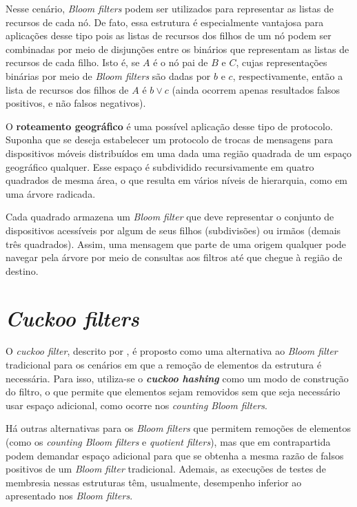 \documentclass[12pt,twoside,english,brazilian]{book}
\begin{document}
Nesse cenário, \textit{Bloom filters} podem ser utilizados para representar as listas de recursos de cada nó. De fato, essa estrutura é especialmente vantajosa para aplicações desse tipo pois as listas de recursos dos filhos de um nó podem ser combinadas por meio de disjunções entre os binários que representam as listas de recursos de cada filho. Isto é, se $A$ é o nó pai de $B$ e $C$, cujas representações binárias por meio de \textit{Bloom filters} são dadas por $b$ e $c$, respectivamente, então a lista de recursos dos filhos de $A$ é $b \lor c$ (ainda ocorrem apenas resultados falsos positivos, e não falsos negativos).

O \textbf{roteamento geográfico} é uma possível aplicação desse tipo de protocolo. Suponha que se deseja estabelecer um protocolo de trocas de mensagens para dispositivos móveis distribuídos em uma dada uma região quadrada de um espaço geográfico qualquer. Esse espaço é subdividido recursivamente em quatro quadrados de mesma área, o que resulta em vários níveis de hierarquia, como em uma árvore radicada.

Cada quadrado armazena um \textit{Bloom filter} que deve representar o conjunto de dispositivos acessíveis por algum de seus filhos (subdivisões) ou irmãos (demais três quadrados). Assim, uma mensagem que parte de uma origem qualquer pode navegar pela árvore por meio de consultas aos filtros até que chegue à região de destino.

\chapter{\textit{Cuckoo filters}}

O \textit{cuckoo filter}, descrito por \citet{cuckoo}, é proposto como uma alternativa ao \textit{Bloom filter} tradicional para os cenários em que a remoção de elementos da estrutura é necessária. Para isso, utiliza-se o \textbf{\textit{cuckoo hashing}} como um modo de construção do filtro, o que permite que elementos sejam removidos sem que seja necessário usar espaço adicional, como ocorre nos \textit{counting Bloom filters}.

Há outras alternativas para os \textit{Bloom filters} que permitem remoções de elementos (como os \textit{counting Bloom filters} e \textit{quotient filters}), mas que em contrapartida podem demandar espaço adicional para que se obtenha a mesma razão de falsos positivos de um \textit{Bloom filter} tradicional. Ademais, as execuções de testes de membresia nessas estruturas têm, usualmente, desempenho inferior ao apresentado nos \textit{Bloom filters}.
\end{document}
